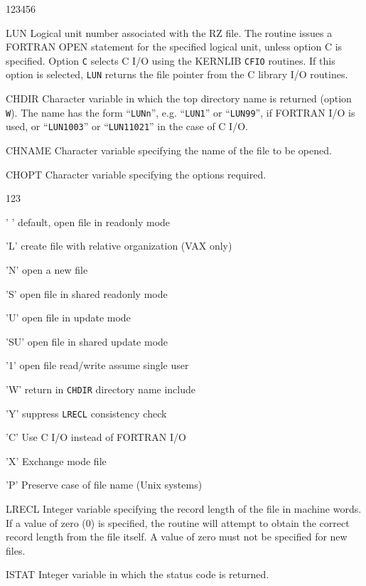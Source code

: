 \begin{DLtt}{123456}
\item[LUN]Logical unit number associated with the RZ file.
The  routine issues a FORTRAN OPEN statement for the
specified logical unit, unless option C is specified.
Option {\tt C} selects C I/O using the KERNLIB {\tt CFIO} routines.
If this option is selected, {\tt LUN} returns the file pointer
from the C library I/O routines.
\item[CHDIR]Character variable in which the top directory
name is returned (option {\tt W}). The name has the form
``{\tt LUNn}'', e.g. ``{\tt LUN1}'' or ``{\tt LUN99}'',
if FORTRAN I/O is used, or 
``{\tt LUN1003}'' or ``{\tt LUN11021}'' in the case of C I/O.
\item[CHNAME]Character variable specifying the name of the 
file to be opened.
\item[CHOPT]Character variable specifying the options required.
\begin{DLtt}{123}
\item[' ']  default, open file in readonly mode
\item['L']  create file with relative organization (VAX only)
\item['N']  open a new file
\item['S']  open file in shared readonly mode
\item['U']  open file in update mode
\item['SU'] open file in shared update mode
\item['1']  open file read/write assume single user
\item['W']  return in {\tt CHDIR} directory name include
\item['Y']  suppress {\tt LRECL} consistency check
\item['C']  Use C I/O instead of FORTRAN I/O
\item['X']  Exchange mode file
\item['P']  Preserve case of file name (Unix systems)
\end{DLtt}
\item[LRECL] Integer variable specifying the record length
of the file in machine words.
If a value of zero (0) is specified, the  routine 
will attempt to obtain the correct record length from
the file itself. A value of zero must not be specified for new files.
\item[ISTAT] Integer variable in which the status code
is returned. 
\end{DLtt}

